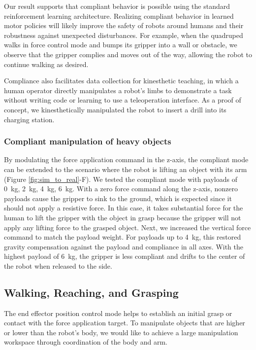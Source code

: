Our result supports that compliant behavior is possible using the standard reinforcement learning architecture. Realizing compliant behavior in learned motor policies will likely improve the safety of robots around humans and their robustness against unexpected disturbances. For example, when the quadruped walks in force control mode and bumps its gripper into a wall or obstacle, we observe that the gripper complies and moves out of the way, allowing the robot to continue walking as desired.

Compliance also facilitates data collection for kinesthetic teaching, in which a human operator directly manipulates a robot's limbs to demonstrate a task without writing code or learning to use a teleoperation interface. As a proof of concept, we kinesthetically manipulated the robot to insert a drill into its charging station.


\subsubsection{Compliant manipulation of heavy objects}

By modulating the force application command in the z-axis, the compliant mode can be extended to the scenario where the robot is lifting an object with its arm (Figure \ref{fig:sim_to_real}-F). We tested the compliant mode with payloads of \SI{0}{\kilo\gram}, \SI{2}{\kilo\gram}, \SI{4}{\kilo\gram}, \SI{6}{\kilo\gram}. With a zero force command along the z-axis, nonzero payloads cause the gripper to sink to the ground, which is expected since it should not apply a resistive force. In this case, it takes substantial force for the human to lift the gripper with the object in grasp because the gripper will not apply any lifting force to the grasped object. Next, we increased the vertical force command to match the payload weight. For payloads up to \SI{4}{\kilo\gram}, this restored gravity compensation against the payload and compliance in all axes. With the highest payload of \SI{6}{\kilo\gram}, the gripper is less compliant and drifts to the center of the robot when released to the side.

\subsection{Walking, Reaching, and Grasping}
\label{sec:posresults}

The end effector position control mode helps to establish an initial grasp or contact with the force application target. To manipulate objects that are higher or lower than the robot's body, we would like to achieve a large manipulation workspace through coordination of the body and arm. 


